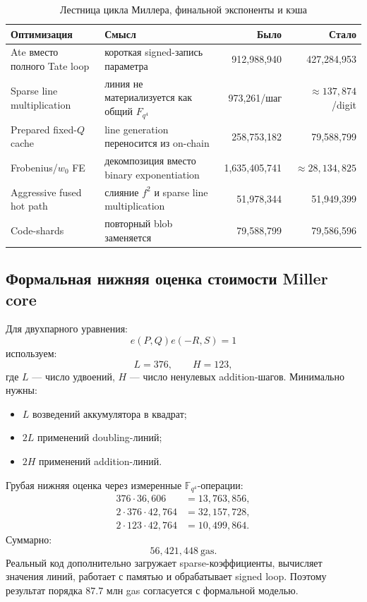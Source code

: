 \documentclass[12pt,a4paper]{article}
\newcommand{\Gas}{\mathrm{gas}}
\newcommand{\code}[1]{\texttt{\detokenize{#1}}}
\begin{document}
\begin{table}[htbp]
\centering
\caption{Лестница цикла Миллера, финальной экспоненты и кэша}
\small
\begin{tabularx}{\linewidth}{Y Y r r}
\toprule
Оптимизация & Смысл & Было & Стало \\
\midrule
Ate вместо полного Tate loop & короткая signed-запись параметра &
912,988,940 & 427,284,953 \\
Sparse line multiplication & линия не материализуется как общий $F_{q^4}$ &
973,261/шаг & $\approx137,874$/digit \\
Prepared fixed-$Q$ cache & line generation переносится из on-chain &
258,753,182 & 79,588,799 \\
Frobenius/$w_0$ FE & декомпозиция вместо binary exponentiation &
1,635,405,741 & $\approx28,134,825$ \\
Aggressive fused hot path & слияние $f^2$ и sparse line multiplication &
51,978,344 & 51,949,399 \\
Code-shards & повторный blob заменяется \code{EXTCODECOPY} &
79,588,799 & 79,586,596 \\
\bottomrule
\end{tabularx}
\end{table}

\subsection{Формальная нижняя оценка стоимости Miller core}

Для двухпарного уравнения:
\[
    e(P,Q)e(-R,S)=1
\]
используем:
\[
    L=376,\qquad H=123,
\]
где $L$ --- число удвоений, $H$ --- число ненулевых addition-шагов.
Минимально нужны:
\begin{itemize}
    \item $L$ возведений аккумулятора в квадрат;
    \item $2L$ применений doubling-линий;
    \item $2H$ применений addition-линий.
\end{itemize}
Грубая нижняя оценка через измеренные $\mathbb{F}_{q^4}$-операции:
\[
\begin{aligned}
    376\cdot 36{,}606 &= 13{,}763{,}856,\\
    2\cdot376\cdot42{,}764 &= 32{,}157{,}728,\\
    2\cdot123\cdot42{,}764 &= 10{,}499{,}864.
\end{aligned}
\]
Суммарно:
\[
    56{,}421{,}448\ \Gas.
\]
Реальный код дополнительно загружает sparse-коэффициенты, вычисляет значения
линий, работает с памятью и обрабатывает signed loop. Поэтому результат порядка $87.7$ млн gas согласуется с формальной моделью.
\end{document}
